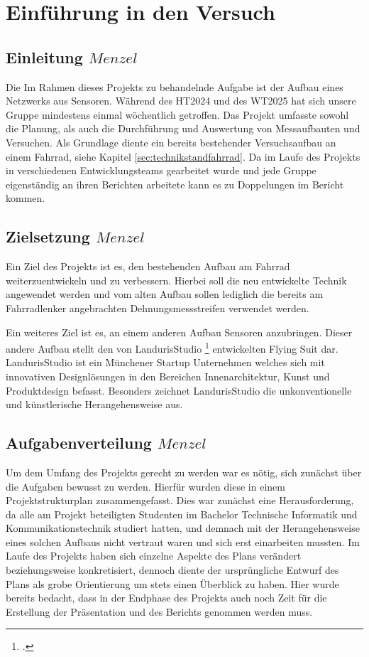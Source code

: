 \chapter{Einführung in den Versuch}
\label{cha:einfuehrung}
\section{Einleitung \(Menzel\)}

Die Im Rahmen dieses Projekts zu behandelnde Aufgabe ist der Aufbau eines Netzwerks aus Sensoren.
Während des HT2024 und des WT2025 hat sich unsere Gruppe mindestens einmal wöchentlich getroffen.
Das Projekt umfasste sowohl die Planung, als auch die Durchführung und Auswertung von Messaufbauten und Versuchen.
Als Grundlage diente ein bereits bestehender Versuchsaufbau an einem Fahrrad, siehe Kapitel \ref{sec:technikstandfahrrad}.
Da im Laufe des Projekts in verschiedenen Entwicklungsteams gearbeitet wurde und jede Gruppe eigenständig an ihren Berichten arbeitete kann es zu Doppelungen im Bericht kommen.

\section{Zielsetzung \(Menzel\)}
Ein Ziel des Projekts ist es, den bestehenden Aufbau am Fahrrad weiterzuentwickeln und zu verbessern.
Hierbei soll die neu entwickelte Technik angewendet werden und vom alten Aufbau sollen lediglich die bereits am Fahrradlenker angebrachten Dehnungsmessstreifen verwendet werden.

Ein weiteres Ziel ist es, an einem anderen Aufbau Sensoren anzubringen.
Dieser andere Aufbau stellt den von LandurisStudio \footcite{https://www.landuris.com/} entwickelten Flying Suit dar.
LandurisStudio ist ein Münchener Startup Unternehmen welches sich mit innovativen Designlösungen in den Bereichen Innenarchitektur, Kunst und Produktdesign befasst.
Besonders zeichnet LandurisStudio die unkonventionelle und künstlerische Herangehensweise aus.


\newpage
\section{Aufgabenverteilung \(Menzel\)}
Um dem Umfang des Projekts gerecht zu werden war es nötig, sich zunächst über die Aufgaben bewusst zu werden.
Hierfür wurden diese in einem Projektstrukturplan zusammengefasst. Dies war zunächst eine Herausforderung, da alle am Projekt beteiligten Studenten im Bachelor Technische Informatik und Kommunikationstechnik studiert hatten,
und demnach mit der Herangehensweise eines solchen Aufbaus nicht vertraut waren und sich erst einarbeiten mussten.
Im Laufe des Projekts haben sich einzelne Aspekte des Plans verändert beziehungsweise konkretisiert, dennoch diente der ursprüngliche Entwurf des Plans als grobe Orientierung um stets einen Überblick zu haben.
Hier wurde bereits bedacht, dass in der Endphase des Projekts auch noch Zeit für die Erstellung der Präsentation und des Berichts genommen werden muss.

